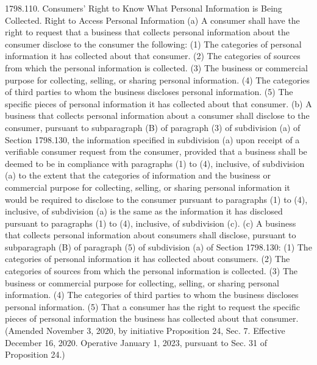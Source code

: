 1798.110.  Consumers’ Right to Know What Personal Information is Being Collected. Right to Access Personal Information
(a) A consumer shall have the right to request that a business that collects personal information about the consumer disclose to the consumer the following:
(1) The categories of personal information it has collected about that consumer.
(2) The categories of sources from which the personal information is collected.
(3) The business or commercial purpose for collecting, selling, or sharing personal information.
(4) The categories of third parties to whom the business discloses personal information.
(5) The specific pieces of personal information it has collected about that consumer.
(b) A business that collects personal information about a consumer shall disclose to the consumer, pursuant to subparagraph (B) of paragraph (3) of subdivision (a) of Section 1798.130, the information specified in subdivision (a) upon receipt of a verifiable consumer request from the consumer, provided that a business shall be deemed to be in compliance with paragraphs (1) to (4), inclusive, of subdivision (a) to the extent that the categories of information and the business or commercial purpose for collecting, selling, or sharing personal information it would be required to disclose to the consumer pursuant to paragraphs (1) to (4), inclusive, of subdivision (a) is the same as the information it has disclosed pursuant to paragraphs (1) to (4), inclusive, of subdivision (c).
(c) A business that collects personal information about consumers shall disclose, pursuant to subparagraph (B) of paragraph (5) of subdivision (a) of Section 1798.130:
(1) The categories of personal information it has collected about consumers.
(2) The categories of sources from which the personal information is collected.
(3) The business or commercial purpose for collecting, selling, or sharing personal information.
(4) The categories of third parties to whom the business discloses personal information.
(5) That a consumer has the right to request the specific pieces of personal information the business has collected about that consumer.
(Amended November 3, 2020, by initiative Proposition 24, Sec. 7. Effective December 16, 2020. Operative January 1, 2023, pursuant to Sec. 31 of Proposition 24.)

